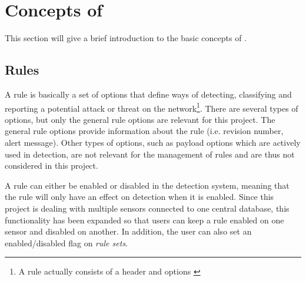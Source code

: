 \section{Concepts of \snort}

This section will give a brief introduction to the basic concepts of
\snort.

\subsection{Rules}

A rule is basically a set of options that define ways of detecting, classifying
and reporting a potential attack or threat on the network\footnote{A rule
actually consists of a header and options \cite{SnortManual}}.
There are several types of options, but only the general rule options are relevant for this
project. The general rule options provide information about the rule
\cite{SnortManual} (i.e. revision number, alert message). Other types of
options, such as payload options which are actively used in detection, are not
relevant for the management of rules and are thus not considered in this project.

A rule can either be enabled or disabled in the detection system, meaning that
the rule will only have an effect on detection when it is enabled. Since this
project is dealing with multiple sensors connected to one central database, this
functionality has been expanded so that users can keep a rule enabled on one
sensor and disabled on another. In addition, the user can also set an
enabled/disabled flag on \textit{rule sets}.


% 
